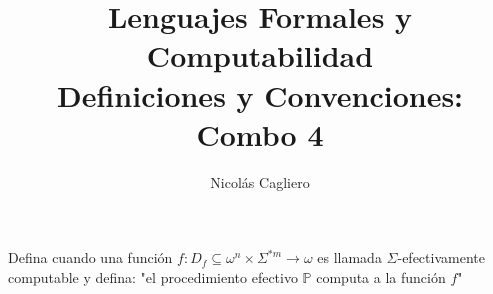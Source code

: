 \documentclass{article}
\title{Lenguajes Formales y Computabilidad \\
        \large Definiciones y Convenciones: Combo 4 }
\author{Nicolás Cagliero}
\begin{document}
\maketitle

Defina cuando una función $f : D_f \subseteq \omega^n \times \Sigma^{*m} 
\rightarrow \omega$
es llamada $\Sigma$-efectivamente computable y defina: "el procedimiento
efectivo $\mathbb{P}$ computa a la función $f$"
\end{document}
